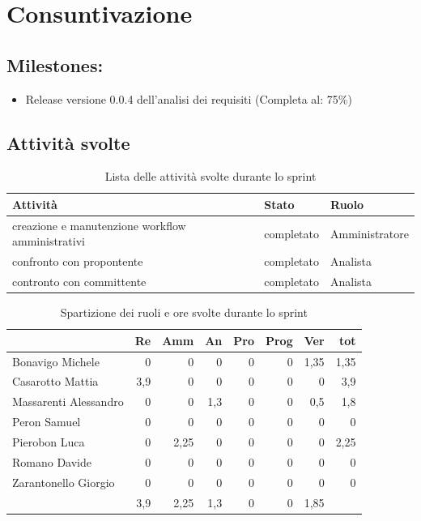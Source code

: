 \section{Consuntivazione}

\subsection{Milestones:}
\begin{itemize}
    \item Release versione 0.0.4 dell'analisi dei requisiti (Completa al: 75\%)
\end{itemize}

\subsection{Attività svolte}

\begin{table}[ht]
    \begin{tabularx}{\textwidth}{X l l}
        
        \rowcolor{gray!30} \textbf{Attività} & \textbf{Stato} & \textbf{Ruolo}\\
        
        \hline
        creazione e manutenzione workflow amministrativi & completato & Amministratore\\
        confronto con propontente & completato & Analista\\
        contronto con committente & completato & Analista\\
        \end{tabularx}
    \caption{Lista delle attività svolte durante lo sprint}
\end{table}


\begin{table}[ht]
    \begin{tabularx}{\linewidth}{X|rrrrrrr}
    \rowcolor{gray!30}& Re & Amm & An & Pro & Prog & Ver & tot \\
    \hline
    Bonavigo Michele                        & 0 & 0 & 0 & 0 & 0 & 1,35  & 1,35 \\
    \rowcolor{gray!10}Casarotto Mattia      & 3,9 & 0 & 0 & 0 & 0 & 0  & 3,9 \\
    Massarenti Alessandro                   & 0 & 0 & 1,3 & 0 & 0 & 0,5  & 1,8 \\
    \rowcolor{gray!10}Peron Samuel          & 0 & 0 & 0 & 0 & 0 & 0 & 0 \\
    Pierobon Luca                           & 0 & 2,25 & 0 & 0 & 0 & 0 & 2,25 \\
    \rowcolor{gray!10}Romano Davide         & 0 & 0 & 0 & 0 & 0 & 0 & 0 \\
    Zarantonello Giorgio                    & 0 & 0 & 0 & 0 & 0 & 0 & 0 \\
    \hline                                  & 3,9 & 2,25 & 1,3 & 0 & 0 & 1,85 & 
    \end{tabularx}
    \caption{\label{ruoli-persone}Spartizione dei ruoli e ore svolte durante lo sprint}
\end{table}

